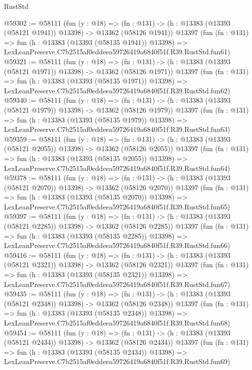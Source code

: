 \begin{lexlean}{RustStd}
\begin{coremodule}
@59302 := @58111
    (fun (y : @18) =>
    (fn : @131) -> (h : @13383 (@13393 (@58121 @1941)) @13398) -> @13362 (@58126 @1941))
    @13397
    (fun (fn : @131) =>
    fun (h : @13383 (@13393 (@58135 @1941)) @13398) =>
    LexLeanPreserve.C7b2515af0eddeea59726419a6840f51f.R39.RustStd.fun61)
@59321 := @58111
    (fun (y : @18) =>
    (fn : @131) -> (h : @13383 (@13393 (@58121 @1971)) @13398) -> @13362 (@58126 @1971))
    @13397
    (fun (fn : @131) =>
    fun (h : @13383 (@13393 (@58135 @1971)) @13398) =>
    LexLeanPreserve.C7b2515af0eddeea59726419a6840f51f.R39.RustStd.fun62)
@59340 := @58111
    (fun (y : @18) =>
    (fn : @131) -> (h : @13383 (@13393 (@58121 @1979)) @13398) -> @13362 (@58126 @1979))
    @13397
    (fun (fn : @131) =>
    fun (h : @13383 (@13393 (@58135 @1979)) @13398) =>
    LexLeanPreserve.C7b2515af0eddeea59726419a6840f51f.R39.RustStd.fun63)
@59359 := @58111
    (fun (y : @18) =>
    (fn : @131) -> (h : @13383 (@13393 (@58121 @2055)) @13398) -> @13362 (@58126 @2055))
    @13397
    (fun (fn : @131) =>
    fun (h : @13383 (@13393 (@58135 @2055)) @13398) =>
    LexLeanPreserve.C7b2515af0eddeea59726419a6840f51f.R39.RustStd.fun64)
@59378 := @58111
    (fun (y : @18) =>
    (fn : @131) -> (h : @13383 (@13393 (@58121 @2070)) @13398) -> @13362 (@58126 @2070))
    @13397
    (fun (fn : @131) =>
    fun (h : @13383 (@13393 (@58135 @2070)) @13398) =>
    LexLeanPreserve.C7b2515af0eddeea59726419a6840f51f.R39.RustStd.fun65)
@59397 := @58111
    (fun (y : @18) =>
    (fn : @131) -> (h : @13383 (@13393 (@58121 @2285)) @13398) -> @13362 (@58126 @2285))
    @13397
    (fun (fn : @131) =>
    fun (h : @13383 (@13393 (@58135 @2285)) @13398) =>
    LexLeanPreserve.C7b2515af0eddeea59726419a6840f51f.R39.RustStd.fun66)
@59416 := @58111
    (fun (y : @18) =>
    (fn : @131) -> (h : @13383 (@13393 (@58121 @2321)) @13398) -> @13362 (@58126 @2321))
    @13397
    (fun (fn : @131) =>
    fun (h : @13383 (@13393 (@58135 @2321)) @13398) =>
    LexLeanPreserve.C7b2515af0eddeea59726419a6840f51f.R39.RustStd.fun67)
@59435 := @58111
    (fun (y : @18) =>
    (fn : @131) -> (h : @13383 (@13393 (@58121 @2348)) @13398) -> @13362 (@58126 @2348))
    @13397
    (fun (fn : @131) =>
    fun (h : @13383 (@13393 (@58135 @2348)) @13398) =>
    LexLeanPreserve.C7b2515af0eddeea59726419a6840f51f.R39.RustStd.fun68)
@59454 := @58111
    (fun (y : @18) =>
    (fn : @131) -> (h : @13383 (@13393 (@58121 @2434)) @13398) -> @13362 (@58126 @2434))
    @13397
    (fun (fn : @131) =>
    fun (h : @13383 (@13393 (@58135 @2434)) @13398) =>
    LexLeanPreserve.C7b2515af0eddeea59726419a6840f51f.R39.RustStd.fun69)

\end{coremodule}
\end{lexlean}
